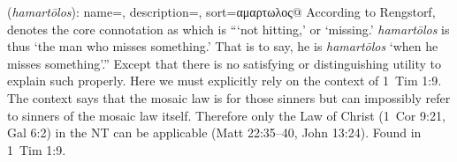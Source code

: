\item[Sinner,]

(\textit{hamartōlos}):
{
    name=,
    description={},
    sort=αμαρτωλος@
}
According to Rengstorf,  denotes the core connotation as  which is ```not hitting,' or `missing.' \emph{hamartōlos} is thus `the man who misses something.' That is to say, he is \emph{hamartōlos} `when he misses something'.'' 
Except that there is no satisfying or distinguishing utility to explain such properly. Here we must explicitly rely on the context of 1~Tim 1:9. The context says that the mosaic law is for those sinners but can impossibly refer to sinners of the mosaic law itself. Therefore only the Law of Christ (1~Cor 9:21, Gal 6:2) in the NT can be applicable (Matt 22:35--40, John 13:24).
Found in 1~Tim 1:9.

